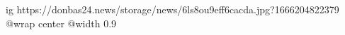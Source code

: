  
 
 
 
 

\ifcmt
  ig https://donbas24.news/storage/news/6ls8ou9eff6cacda.jpg?1666204822379
  @wrap center
  @width 0.9
\fi
